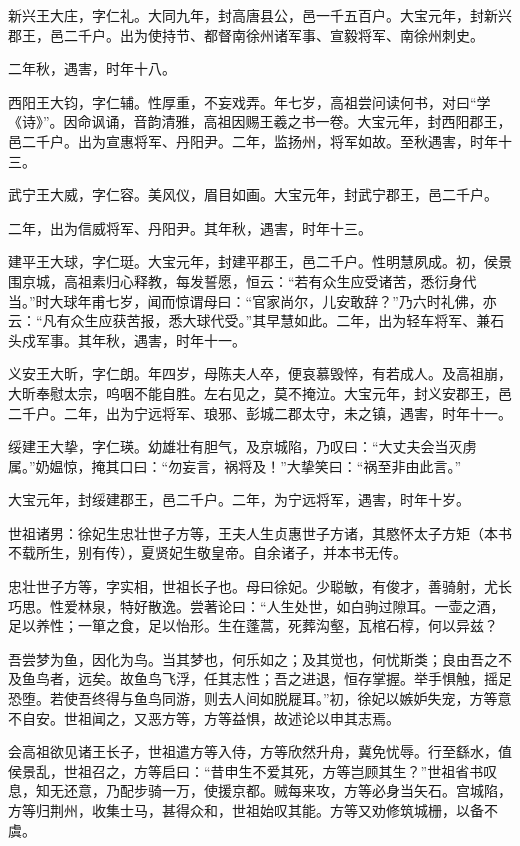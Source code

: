 \documentclass[12pt,UTF8]{ctexbook}
\begin{document}
新兴王大庄，字仁礼。大同九年，封高唐县公，邑一千五百户。大宝元年，封新兴郡王，邑二千户。出为使持节、都督南徐州诸军事、宣毅将军、南徐州刺史。

二年秋，遇害，时年十八。

西阳王大钧，字仁辅。性厚重，不妄戏弄。年七岁，高祖尝问读何书，对曰“学《诗》”。因命讽诵，音韵清雅，高祖因赐王羲之书一卷。大宝元年，封西阳郡王，邑二千户。出为宣惠将军、丹阳尹。二年，监扬州，将军如故。至秋遇害，时年十三。

武宁王大威，字仁容。美风仪，眉目如画。大宝元年，封武宁郡王，邑二千户。

二年，出为信威将军、丹阳尹。其年秋，遇害，时年十三。

建平王大球，字仁珽。大宝元年，封建平郡王，邑二千户。性明慧夙成。初，侯景围京城，高祖素归心释教，每发誓愿，恒云：“若有众生应受诸苦，悉衍身代当。”时大球年甫七岁，闻而惊谓母曰：“官家尚尔，儿安敢辞？”乃六时礼佛，亦云：“凡有众生应获苦报，悉大球代受。”其早慧如此。二年，出为轻车将军、兼石头戍军事。其年秋，遇害，时年十一。

义安王大昕，字仁朗。年四岁，母陈夫人卒，便哀慕毁悴，有若成人。及高祖崩，大昕奉慰太宗，呜咽不能自胜。左右见之，莫不掩泣。大宝元年，封义安郡王，邑二千户。二年，出为宁远将军、琅邪、彭城二郡太守，未之镇，遇害，时年十一。

绥建王大挚，字仁瑛。幼雄壮有胆气，及京城陷，乃叹曰：“大丈夫会当灭虏属。”奶媪惊，掩其口曰：“勿妄言，祸将及！”大挚笑曰：“祸至非由此言。”

大宝元年，封绥建郡王，邑二千户。二年，为宁远将军，遇害，时年十岁。

世祖诸男：徐妃生忠壮世子方等，王夫人生贞惠世子方诸，其愍怀太子方矩（本书不载所生，别有传），夏贤妃生敬皇帝。自余诸子，并本书无传。

忠壮世子方等，字实相，世祖长子也。母曰徐妃。少聪敏，有俊才，善骑射，尤长巧思。性爱林泉，特好散逸。尝著论曰：“人生处世，如白驹过隙耳。一壶之酒，足以养性；一箪之食，足以怡形。生在蓬蒿，死葬沟壑，瓦棺石椁，何以异兹？

吾尝梦为鱼，因化为鸟。当其梦也，何乐如之；及其觉也，何忧斯类；良由吾之不及鱼鸟者，远矣。故鱼鸟飞浮，任其志性；吾之进退，恒存掌握。举手惧触，摇足恐堕。若使吾终得与鱼鸟同游，则去人间如脱屣耳。”初，徐妃以嫉妒失宠，方等意不自安。世祖闻之，又恶方等，方等益惧，故述论以申其志焉。

会高祖欲见诸王长子，世祖遣方等入侍，方等欣然升舟，冀免忧辱。行至繇水，值侯景乱，世祖召之，方等启曰：“昔申生不爱其死，方等岂顾其生？”世祖省书叹息，知无还意，乃配步骑一万，使援京都。贼每来攻，方等必身当矢石。宫城陷，方等归荆州，收集士马，甚得众和，世祖始叹其能。方等又劝修筑城栅，以备不虞。
\end{document}
